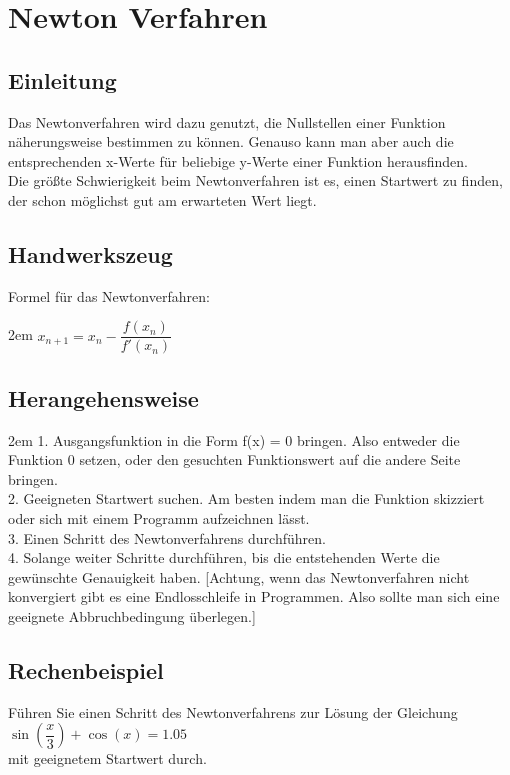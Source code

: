 \documentclass[11pt,final]{scrreprt}
\newcommand{\br} {\medskip\\}
\begin{document}
\chapter{Newton Verfahren}

\section{Einleitung}

Das Newtonverfahren wird dazu genutzt, die Nullstellen einer Funktion näherungsweise bestimmen zu können. 
Genauso kann man aber auch die entsprechenden x-Werte für beliebige y-Werte einer Funktion herausfinden.\\
Die größte Schwierigkeit beim Newtonverfahren ist es, einen Startwert zu finden, der schon möglichst gut am erwarteten Wert liegt.\\
	
\section{Handwerkszeug}

Formel für das Newtonverfahren:

\begingroup
\leftskip2em 
$ x_{n+1} = x_n - \dfrac{f(x_n)}{f'(x_n)} $\\
\par	
\endgroup 

\section{Herangehensweise}

\begingroup
\leftskip2em 
1. Ausgangsfunktion in die Form f(x) = 0 bringen. Also entweder die Funktion 0 setzen, oder den gesuchten Funktionswert auf die andere Seite bringen.\br
2. Geeigneten Startwert suchen. Am besten indem man die Funktion skizziert oder sich mit einem Programm aufzeichnen lässt.\br
3. Einen Schritt des Newtonverfahrens durchführen.\br
4. Solange weiter Schritte durchführen, bis die entstehenden Werte die gewünschte Genauigkeit haben. [Achtung, wenn das Newtonverfahren nicht konvergiert gibt es eine Endlosschleife in Programmen. Also sollte man sich eine geeignete Abbruchbedingung überlegen.]\br
\par	
\endgroup 
\section{Rechenbeispiel}

Führen Sie einen Schritt des Newtonverfahrens zur Lösung der Gleichung\\
	\hspace*{2em}$ \sin\left( \dfrac{x}{3}\right) + \cos(x) = 1.05 $\\
mit geeignetem Startwert durch.\br
\end{document}
